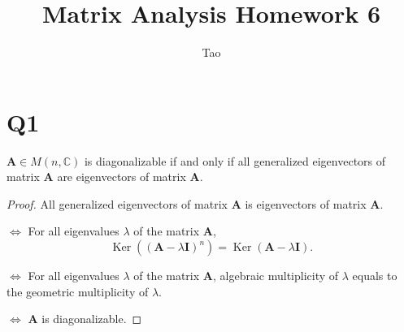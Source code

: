 \documentclass[12pt]{homework}
\title{Matrix Analysis \quad Homework 6}
\author{Tao}
\institute{School of Mathematics}
\begin{document}
\maketitle

\section*{Q1}
\begin{proposition}
    $\mathbf{A} \in M(n, \mathbb{C})$ is diagonalizable if and only if all generalized eigenvectors of matrix $\mathbf{A}$ are eigenvectors of matrix $\mathbf{A}$.
\end{proposition}

\begin{proof}
    All generalized eigenvectors of matrix $\mathbf{A}$ is eigenvectors of matrix $\mathbf{A}$. 
    
    $\Leftrightarrow$
    For all eigenvalues $\lambda$ of the matrix $\mathbf{A}$, 
    \begin{equation*}
        \operatorname{Ker}\left( (\mathbf{A} - \lambda \mathbf{I})^n \right) =  \operatorname{Ker}\left(\mathbf{A} - \lambda \mathbf{I} \right) .
    \end{equation*}

    $\Leftrightarrow$ For all eigenvalues $\lambda$ of the matrix $\mathbf{A}$, algebraic multiplicity of $\lambda$ equals to the geometric multiplicity  of $\lambda$.

    $\Leftrightarrow$ $\mathbf{A}$ is diagonalizable.

\end{proof}
\end{document}
